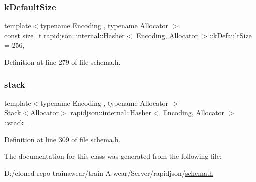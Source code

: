 \subsubsection{\texorpdfstring{kDefaultSize}{kDefaultSize}}
{\footnotesize\ttfamily template$<$typename Encoding , typename Allocator $>$ \\
const size\+\_\+t \mbox{\hyperlink{classrapidjson_1_1internal_1_1_hasher}{rapidjson\+::internal\+::\+Hasher}}$<$ \mbox{\hyperlink{classrapidjson_1_1_encoding}{Encoding}}, \mbox{\hyperlink{classrapidjson_1_1_allocator}{Allocator}} $>$\+::k\+Default\+Size = 256\hspace{0.3cm}{\ttfamily [static]}, {\ttfamily [private]}}



Definition at line 279 of file schema.\+h.

\mbox{\label{classrapidjson_1_1internal_1_1_hasher_ab1523886f80d5f979813f02ca3d39c29}} 
\subsubsection{\texorpdfstring{stack\_}{stack\_}}
{\footnotesize\ttfamily template$<$typename Encoding , typename Allocator $>$ \\
\mbox{\hyperlink{classrapidjson_1_1internal_1_1_stack}{Stack}}$<$\mbox{\hyperlink{classrapidjson_1_1_allocator}{Allocator}}$>$ \mbox{\hyperlink{classrapidjson_1_1internal_1_1_hasher}{rapidjson\+::internal\+::\+Hasher}}$<$ \mbox{\hyperlink{classrapidjson_1_1_encoding}{Encoding}}, \mbox{\hyperlink{classrapidjson_1_1_allocator}{Allocator}} $>$\+::stack\+\_\+\hspace{0.3cm}{\ttfamily [private]}}



Definition at line 309 of file schema.\+h.



The documentation for this class was generated from the following file\+:\begin{DoxyCompactItemize}
\item 
D\+:/cloned repo trainawear/train-\/\+A-\/wear/\+Server/rapidjson/\mbox{\hyperlink{schema_8h}{schema.\+h}}\end{DoxyCompactItemize}

